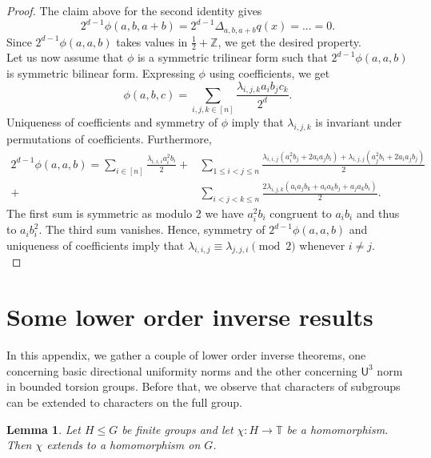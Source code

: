 \documentclass[a4paper,11pt]{article}
\numberwithin{theorem}{section}
\newtheorem{lemma}[theorem]{Lemma}
\theoremstyle{definition}
\begin{document}
\begin{proof}
    The claim above for the second identity gives
    \[ 2^{d-1}\phi(a,b,a+b) = 2^{d-1}\Delta_{a, b, a + b}q(x) = ... = 0.\]
    Since $2^{d-1}\phi(a,a,b)$ takes values in $\frac{1}{2} + \mathbb{Z}$, we get the desired property.\\

    Let us now assume that $\phi$ is a symmetric trilinear form such that $2^{d-1}\phi(a,a,b)$ is symmetric bilinear form. Expressing $\phi$ using coefficients, we get
    \[\phi(a,b,c) = \sum_{i,j,k \in [n]} \frac{\lambda_{i,j,k} a_ib_jc_k}{2^d}.\]
    Uniqueness of coefficients and symmetry of $\phi$ imply that $\lambda_{i,j,k}$ is invariant under permutations of coefficients. Furthermore,
    \begin{align*}2^{d-1}\phi(a,a,b) = \sum_{i \in [n]} \frac{\lambda_{i,i,i} a_i^2b_i}{2} + & \sum_{1\leq i < j \leq n} \frac{\lambda_{i,i,j} (a_i^2b_j +2a_ia_jb_i ) + \lambda_{i,j,j}(a_j^2b_i + 2a_ia_jb_j)}{2}\\
    + &\sum_{i < j < k \leq n} \frac{2\lambda_{i,j,k}(a_ia_jb_k + a_i a_k b_j + a_j a_k b_i)}{2}.\end{align*}
    The first sum is symmetric as modulo 2 we have $a_i^2b_i$ congruent to $a_ib_i$ and thus to $a_i b_i^2$. The third sum vanishes. Hence, symmetry of $2^{d-1}\phi(a,a,b)$ and uniqueness of coefficients imply that $\lambda_{i,i,j} \equiv \lambda_{j,j,i} \pmod{2}$ whenever $i \not=j$.\\

    
\end{proof}

\section{Some lower order inverse results}

In this appendix, we gather a couple of lower order inverse theorems, one concerning basic directional uniformity norms and the other concerning $\mathsf{U}^3$ norm in bounded torsion groups. Before that, we observe that characters of subgroups can be extended to characters on the full group.

\begin{lemma}\label{charextnlemma}
    Let $H \leq G$ be finite groups and let $\chi : H \to \mathbb{T}$ be a homomorphism. Then $\chi$ extends to a homomorphism on $G$.
\end{lemma}
\end{document}
